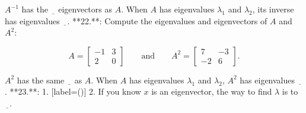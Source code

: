 \(A^{-1}\) has the \(\underline{\phantom{x}}\) eigenvectors as \(A\). When \(A\) has eigenvalues \(\lambda_{1}\) and \(\lambda_{2}\), its inverse has eigenvalues \(\underline{\phantom{x}}\).
**22.**: Compute the eigenvalues and eigenvectors of \(A\) and \(A^{2}\):

\[A=\begin{bmatrix}-1&3\\ 2&0\end{bmatrix}\qquad\text{and}\qquad A^{2}=\begin{bmatrix}7&-3\\ -2&6\end{bmatrix}.\]

\(A^{2}\) has the same \(\underline{\phantom{x}}\) as \(A\). When \(A\) has eigenvalues \(\lambda_{1}\) and \(\lambda_{2}\), \(A^{2}\) has eigenvalues \(\underline{\phantom{x}}\).
**23.**:
1. [label=()]
2. If you know \(x\) is an eigenvector, the way to find \(\lambda\) is to \(\underline{\phantom{x}}\).

